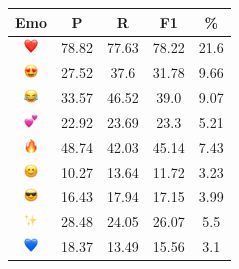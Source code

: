 \documentclass{article}
\begin{document}
\begin{table}
\centering
\begin{tabular}{|c|ccc|c|} \hline
\textbf{Emo} & \textbf{P} & \textbf{R} & \textbf{F1} & \textbf{\%} \\ \hline
\includegraphics[height=0.37cm,width=0.37cm]{img/red_heart.png} & 78.82 & 77.63 & 78.22 & 21.6\\ 
\includegraphics[height=0.37cm,width=0.37cm]{img/smiling_face_with_hearteyes.png} & 27.52 & 37.6 & 31.78 & 9.66\\ 
\includegraphics[height=0.37cm,width=0.37cm]{img/face_with_tears_of_joy.png} & 33.57 & 46.52 & 39.0 & 9.07\\ 
\includegraphics[height=0.37cm,width=0.37cm]{img/two_hearts.png} & 22.92 & 23.69 & 23.3 & 5.21\\ 
\includegraphics[height=0.37cm,width=0.37cm]{img/fire.png} & 48.74 & 42.03 & 45.14 & 7.43\\ 
\includegraphics[height=0.37cm,width=0.37cm]{img/smiling_face_with_smiling_eyes.png} & 10.27 & 13.64 & 11.72 & 3.23\\ 
\includegraphics[height=0.37cm,width=0.37cm]{img/smiling_face_with_sunglasses.png} & 16.43 & 17.94 & 17.15 & 3.99\\ 
\includegraphics[height=0.37cm,width=0.37cm]{img/sparkles.png} & 28.48 & 24.05 & 26.07 & 5.5\\ 
\includegraphics[height=0.37cm,width=0.37cm]{img/blue_heart.png} & 18.37 & 13.49 & 15.56 & 3.1\\ 

\end{tabular}
\end{table}
\end{document}
